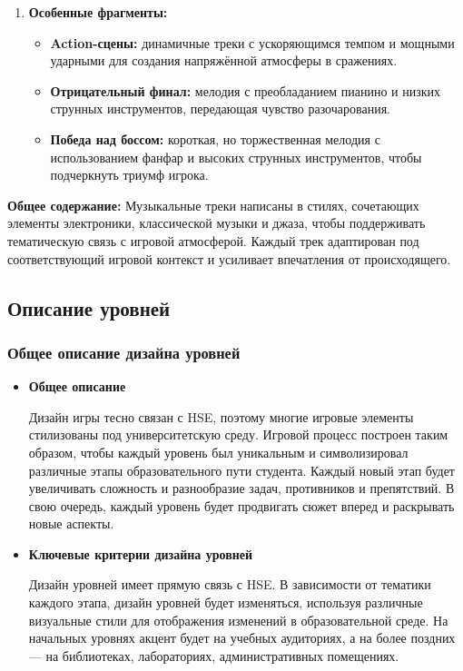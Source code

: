 \documentclass{article}
\begin{document}
\begin{enumerate}
    \item \textbf{Особенные фрагменты:}  
    \begin{itemize}
        \item \textbf{Action-сцены:} динамичные треки с ускоряющимся темпом и мощными ударными для создания напряжённой атмосферы в сражениях.  
        \item \textbf{Отрицательный финал:} мелодия с преобладанием пианино и низких струнных инструментов, передающая чувство разочарования.  
        \item \textbf{Победа над боссом:} короткая, но торжественная мелодия с использованием фанфар и высоких струнных инструментов, чтобы подчеркнуть триумф игрока.  
    \end{itemize}
    \end{enumerate}

    \textbf{Общее содержание:}  
    Музыкальные треки написаны в стилях, сочетающих элементы электроники, классической музыки и джаза, чтобы поддерживать тематическую связь с игровой атмосферой. Каждый трек адаптирован под соответствующий игровой контекст и усиливает впечатления от происходящего.
\subsection{Описание уровней}

\subsubsection{Общее описание дизайна уровней}
    \begin{itemize}
    \item \textbf{Общее описание} \par
    Дизайн игры тесно связан с HSE, поэтому многие игровые элементы стилизованы под университетскую среду. 
    Игровой процесс построен таким образом, чтобы каждый уровень был уникальным и символизировал различные этапы образовательного пути студента. 
    Каждый новый этап будет увеличивать сложность и разнообразие задач, противников и препятствий. В свою очередь, каждый уровень будет продвигать сюжет вперед и раскрывать новые аспекты.

    \item \textbf{Ключевые критерии дизайна уровней} \par
    Дизайн уровней имеет прямую связь с HSE. В зависимости от тематики каждого этапа, дизайн уровней будет изменяться, используя различные визуальные стили для отображения изменений в образовательной среде.
    На начальных уровнях акцент будет на учебных аудиториях, а на более поздних — на библиотеках, лабораториях, административных помещениях.
    \end{itemize}
\end{document}
